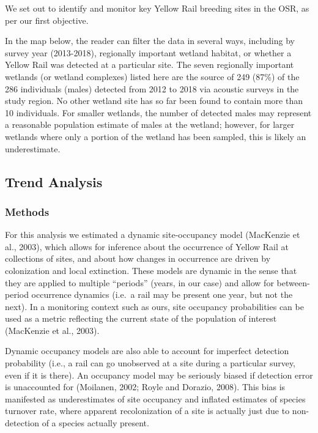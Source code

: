 \documentclass[11pt,]{article}
\begin{document}
We set out to identify and monitor key Yellow Rail breeding sites in the
OSR, as per our first objective.

In the map below, the reader can filter the data in several ways,
including by survey year (2013-2018), regionally important wetland
habitat, or whether a Yellow Rail was detected at a particular site. The
seven regionally important wetlands (or wetland complexes) listed here
are the source of 249 (87\%) of the 286 individuals (males) detected
from 2012 to 2018 via acoustic surveys in the study region. No other
wetland site has so far been found to contain more than 10 individuals.
For smaller wetlands, the number of detected males may represent a
reasonable population estimate of males at the wetland; however, for
larger wetlands where only a portion of the wetland has been sampled,
this is likely an underestimate.

\subsection{Trend Analysis}\label{trend-analysis}

\subsubsection{Methods}\label{methods}

For this analysis we estimated a dynamic site-occupancy model (MacKenzie
et al., 2003), which allows for inference about the occurrence of Yellow
Rail at collections of sites, and about how changes in occurrence are
driven by colonization and local extinction. These models are dynamic in
the sense that they are applied to multiple ``periods'' (years, in our
case) and allow for between-period occurrence dynamics (i.e.~a rail may
be present one year, but not the next). In a monitoring context such as
ours, site occupancy probabilities can be used as a metric reflecting
the current state of the population of interest (MacKenzie et al.,
2003).

Dynamic occupancy models are also able to account for imperfect
detection probability (i.e., a rail can go unobserved at a site during a
particular survey, even if it is there). An occupancy model may be
seriously biased if detection error is unaccounted for (Moilanen, 2002;
Royle and Dorazio, 2008). This bias is manifested as underestimates of
site occupancy and inflated estimates of species turnover rate, where
apparent recolonization of a site is actually just due to non-detection
of a species actually present.
\end{document}
